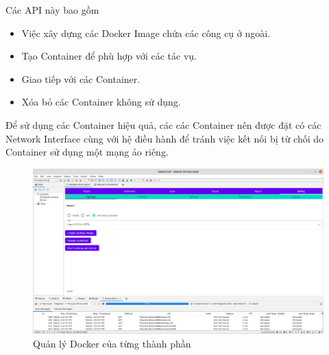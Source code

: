 \documentclass[./../main.tex]{subfiles}
\begin{document}
Các API này bao gồm
\begin{itemize}
	\item Việc xây dựng các Docker Image chứa các công cụ ở ngoài.
	\item Tạo Container để phù hợp với các tác vụ.
	\item Giao tiếp với các Container.
	\item Xóa bỏ các Container không sử dụng.
\end{itemize}

Để sử dụng các Container hiệu quả, các các Container nên được đặt
có các Network Interface cùng với hệ điều hành để tránh việc kết nối
bị từ chối do Container sử dụng một mạng ảo riêng.

\begin{figure}[ht!]
	\includegraphics[width=\linewidth]{./images/docker.png}
	\caption{Quản lý Docker của từng thành phần}
	\label{fig:docker}
\end{figure}
\end{document}

